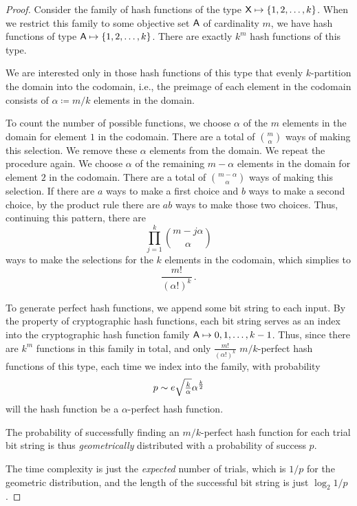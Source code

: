 \documentclass[ ../main.tex]{subfiles}
\begin{document}
\begin{proof}
Consider the family of hash functions of the type $\Set{X} \mapsto \{1,2,\ldots,k\}$.
When we restrict this family to some objective set $\Set{A}$ of cardinality $m$, we have hash functions of type $\Set{A} \mapsto \{1,2,\ldots,k\}$.
There are exactly $k^m$ hash functions of this type.

We are interested only in those hash functions of this type that evenly $k$-partition the domain into the codomain, i.e., the preimage of each element in the codomain consists of $\alpha \coloneqq m/k$ elements in the domain.

To count the number of possible functions, we choose $\alpha$ of the $m$ elements in the domain for element $1$ in the codomain.
There are a total of $m \choose \alpha$ ways of making this selection.
We remove these $\alpha$ elements from the domain.
We repeat the procedure again.
We choose $\alpha$ of the remaining $m-\alpha$ elements in the domain for element $2$ in the codomain.
There are a total of ${m-\alpha} \choose \alpha$ ways of making this selection.
If there are $a$ ways to make a first choice and $b$ ways to make a second choice, by the product rule there are $a b$ ways to make those two choices.
Thus, continuing this pattern, there are
\begin{equation}
	\prod_{j=1}^{k} {{m - j \alpha} \choose \alpha}
\end{equation}
ways to make the selections for the $k$ elements in the codomain, which simplies to
\begin{equation}
	\frac{m!}{(\alpha!)^k}\,.
\end{equation}

To generate perfect hash functions, we append some bit string to each input.
By the property of cryptographic hash functions, each bit string serves as an index into the cryptographic hash function family $\Set{A} \mapsto {0,1,\ldots,k-1}$.
Thus, since there are $k^m$ functions in this family in total, and only $\frac{m!}{(\alpha!)^k}$ $m/k$-perfect hash functions of this type, each time we index into the family, with probability
\begin{equation}
	p \sim e \mathsmaller{\sqrt{\frac{k}{\alpha}}} \alpha^{\frac{k}{2}}
\end{equation}
will the hash function be a $\alpha$-perfect hash function.

The probability of successfully finding an $m/k$-perfect hash function for each trial bit string is thus \emph{geometrically} distributed with a probability of success $p$.

The time complexity is just the \emph{expected} number of trials, which is $1/p$ for the geometric distribution, and the length of the successful bit string is just $\log_2 1/p$.
\end{proof}
\end{document}
